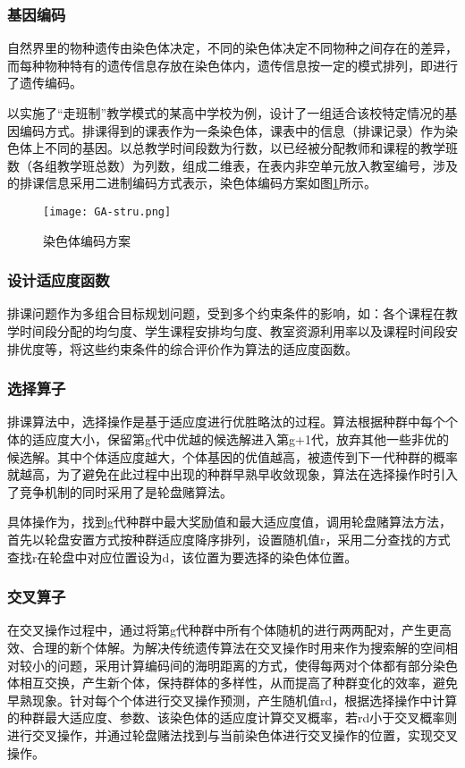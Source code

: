 \documentclass[bwprint]{cumcmthesis}
\begin{document}
\subsubsection{基因编码}
自然界里的物种遗传由染色体决定，不同的染色体决定不同物种之间存在的差异，而每种物种特有的遗传信息存放在染色体内，遗传信息按一定的模式排列，即进行了遗传编码。

以实施了“走班制”教学模式的某高中学校为例，设计了一组适合该校特定情况的基因编码方式。排课得到的课表作为一条染色体，课表中的信息（排课记录）作为染色体上不同的基因。以总教学时间段数为行数，以已经被分配教师和课程的教学班数（各组教学班总数）为列数，组成二维表，在表内非空单元放入教室编号，涉及的排课信息采用二进制编码方式表示，染色体编码方案如图\ref{fig:RST_pic}所示。
\begin{figure}[!ht]
	\centering

	\texttt{[image: GA-stru.png]}
	\caption{染色体编码方案}	
	\label{fig:RST_pic}
\end{figure}
\subsubsection{设计适应度函数}

排课问题作为多组合目标规划问题，受到多个约束条件的影响，如：各个课程在教学时间段分配的均匀度、学生课程安排均匀度、教室资源利用率以及课程时间段安排优度等，将这些约束条件的综合评价作为算法的适应度函数。

\subsubsection{选择算子}
排课算法中，选择操作是基于适应度进行优胜略汰的过程。算法根据种群中每个个体的适应度大小，保留第g代中优越的候选解进入第g+1代，放弃其他一些非优的候选解。其中个体适应度越大，个体基因的优值越高，被遗传到下一代种群的概率就越高，为了避免在此过程中出现的种群早熟早收敛现象，算法在选择操作时引入了竞争机制的同时采用了是轮盘赌算法。

具体操作为，找到g代种群中最大奖励值和最大适应度值，调用轮盘赌算法方法，首先以轮盘安置方式按种群适应度降序排列，设置随机值r，采用二分查找的方式查找r在轮盘中对应位置设为d，该位置为要选择的染色体位置。

\subsubsection{交叉算子}
在交叉操作过程中，通过将第g代种群中所有个体随机的进行两两配对，产生更高效、合理的新个体解。为解决传统遗传算法在交叉操作时用来作为搜索解的空间相对较小的问题，采用计算编码间的海明距离的方式，使得每两对个体都有部分染色体相互交换，产生新个体，保持群体的多样性，从而提高了种群变化的效率，避免早熟现象。针对每个个体进行交叉操作预测，产生随机值rd，根据选择操作中计算的种群最大适应度、参数、该染色体的适应度计算交叉概率，若rd小于交叉概率则进行交叉操作，并通过轮盘赌法找到与当前染色体进行交叉操作的位置，实现交叉操作。
\end{document}
